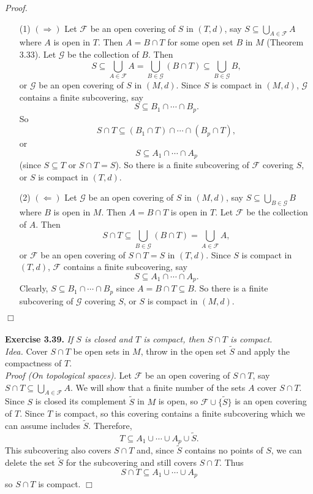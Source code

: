 \documentclass{article}
\begin{document}
\emph{Proof.}
\begin{enumerate}
\item[(1)]
$(\Longrightarrow)$
Let $\mathscr{F}$ be an open covering of $S$ in $(T,d)$, say
$S \subseteq \bigcup_{A \in \mathscr{F}} A$ where $A$ is open in $T$.
Then $A = B \cap T$ for some open set $B$ in $M$ (Theorem 3.33).
Let $\mathscr{G}$ be the collection of $B$.
Then
$$S \subseteq
\bigcup_{A \in \mathscr{F}} A
= \bigcup_{B \in \mathscr{G}} (B \cap T)
\subseteq \bigcup_{B \in \mathscr{G}} B,$$
or $\mathscr{G}$ be an open covering of $S$ in $(M,d)$.
Since $S$ is compact in $(M,d)$,
$\mathscr{G}$ contains a finite subcovering, say
$$S \subseteq B_1 \cap \cdots \cap B_p.$$
So $$S \cap T \subseteq (B_1\cap T) \cap \cdots \cap (B_p \cap T),$$
or $$S \subseteq A_1 \cap \cdots \cap A_p$$ (since $S \subseteq T$ or $S \cap T = S$).
So there is a finite subcovering of $\mathscr{F}$ covering $S$,
or $S$ is compact in $(T,d)$.
\item[(2)]
$(\Longleftarrow)$
Let $\mathscr{G}$ be an open covering of $S$ in $(M,d)$, say
$S \subseteq \bigcup_{B \in \mathscr{G}} B$ where $B$ is open in $M$.
Then $A = B \cap T$ is open in $T$.
Let $\mathscr{F}$ be the collection of $A$.
Then
$$S \cap T \subseteq
\bigcup_{B \in \mathscr{G}} (B \cap T)
= \bigcup_{A \in \mathscr{F}} A,$$
or $\mathscr{F}$ be an open covering of $S \cap T = S$ in $(T,d)$.
Since $S$ is compact in $(T,d)$,
$\mathscr{F}$ contains a finite subcovering, say
$$S \subseteq A_1 \cap \cdots \cap A_p.$$
Clearly, $S \subseteq B_1 \cap \cdots \cap B_p$ since $A = B \cap T \subseteq B$.
So there is a finite subcovering of $\mathscr{G}$ covering $S$,
or $S$ is compact in $(M,d)$.
\end{enumerate}
$\Box$ \\\\






\textbf{Exercise 3.39.}
\emph{If $S$ is closed and $T$ is compact, then $S \cap T$ is compact.} \\

\emph{Idea.}
Cover $S \cap T$ be open sets in $M$, throw in the open set $\widetilde{S}$
and apply the compactness of $T$. \\

\emph{Proof (On topological spaces).}
Let $\mathscr{F}$ be an open covering of $S \cap T$, say
$S \cap T \subseteq \bigcup_{A \in \mathscr{F}}A$.
We will show that a finite number of the sets $A$ cover $S \cap T$.
Since $S$ is closed its complement $\widetilde{S}$ in $M$ is open,
so $\mathscr{F} \cup \{ \widetilde{S} \}$ is an open covering of $T$.
Since $T$ is compact, so this covering contains a finite subcovering
which we can assume includes $\widetilde{S}$.
Therefore,
$$T \subseteq A_1 \cup \cdots \cup A_p \cup \widetilde{S}.$$
This subcovering also covers $S \cap T$ and, since $\widetilde{S}$ contains no points of $S$,
we can delete the set $\widetilde{S}$ for the subcovering and still covers $S \cap T$.
Thus
$$S \cap T \subseteq A_1 \cup \cdots \cup A_p$$
so $S \cap T$ is compact.
$\Box$ \\
\end{document}
